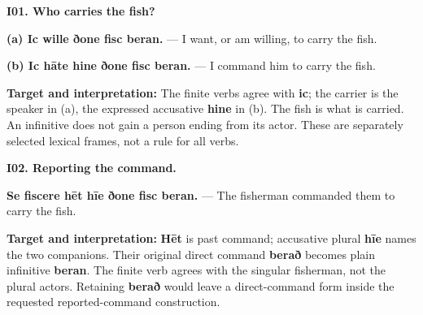 \par\begin{minipage}{\linewidth}\raggedright
\textbf{I01. Who carries the fish?}

\textbf{(a) Ic wille ðone fisc beran.} — I want, or am willing, to carry the fish.

\textbf{(b) Ic hāte hine ðone fisc beran.} — I command him to carry the fish.

\textbf{Target and interpretation:} The finite verbs agree with \textbf{ic}; the carrier is the speaker in (a), the expressed accusative \textbf{hine} in (b). The fish is what is carried. An infinitive does not gain a person ending from its actor. These are separately selected lexical frames, not a rule for all verbs.

\end{minipage}\par\addvspace{4pt}

\par\begin{minipage}{\linewidth}\raggedright
\textbf{I02. Reporting the command.}

\textbf{Se fiscere hēt hīe ðone fisc beran.} — The fisherman commanded them to carry the fish.

\textbf{Target and interpretation:} \textbf{Hēt} is past command; accusative plural \textbf{hīe} names the two companions. Their original direct command \textbf{berað} becomes plain infinitive \textbf{beran}. The finite verb agrees with the singular fisherman, not the plural actors. Retaining \textbf{berað} would leave a direct-command form inside the requested reported-command construction.

\end{minipage}\par\addvspace{4pt}

